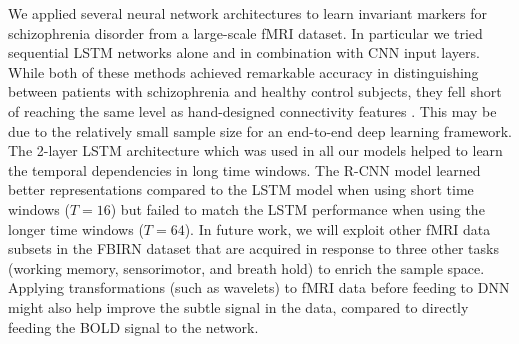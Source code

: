 \documentclass{article}
\begin{document}
We applied several neural network architectures to learn invariant markers for schizophrenia disorder from a large-scale fMRI dataset. In particular we tried sequential LSTM networks alone and in combination with CNN input layers. While both of these methods achieved remarkable accuracy in distinguishing between patients with schizophrenia and healthy control subjects, they fell short of reaching the same level as hand-designed connectivity features \citep{Gheiratmand2017}. This may be due to the relatively small sample size for an end-to-end deep learning framework. The 2-layer LSTM architecture which was used in all our models helped to learn the temporal dependencies in long time windows. The R-CNN model learned better representations compared to the LSTM model when using short time windows ($T=16$) but failed to match the LSTM performance when using the longer time windows ($T=64$). In future work, we will exploit other fMRI data subsets in the FBIRN dataset that are acquired in response to three other tasks (working memory, sensorimotor, and breath hold) to enrich the sample space. Applying transformations (such as wavelets) to fMRI data before feeding to DNN might also help improve the subtle signal in the data, compared to directly feeding the BOLD signal to the network.  





\end{document}

